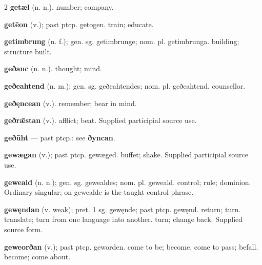 \begin{multicols*}{2}
\textbf{getæl} (n. n.). number; company.\par
\textbf{getēon} (v.); past ptcp. getogen. train; educate.\par
\textbf{getimbrung} (n. f.); gen. sg. getimbrunge; nom. pl. getimbrunga. building; structure built.\par
\textbf{geðanc} (n. n.). thought; mind.\par
\textbf{geðeahtend} (n. m.); gen. sg. geðeahtendes; nom. pl. geðeahtend. counsellor.\par
\textbf{geðęncean} (v.). remember; bear in mind.\par
\textbf{geðrǣstan} (v.). afflict; beat. Supplied participial source use.\par
\textbf{geðūht} — past ptcp.: see \textbf{ðyncan}.\par
\textbf{gewǣgan} (v.); past ptcp. gewǣged. buffet; shake. Supplied participial source use.\par
\textbf{geweald} (n. n.); gen. sg. gewealdes; nom. pl. geweald. control; rule; dominion. Ordinary singular; on gewealde is the taught control phrase.\par
\textbf{gewęndan} (v. weak); pret. 1 sg. gewęnde; past ptcp. gewęnd. return; turn. translate; turn from one language into another. turn; change back. Supplied source form.\par
\textbf{geweorðan} (v.); past ptcp. geworden. come to be; become. come to pass; befall. become; come about.\par

\end{multicols*}
